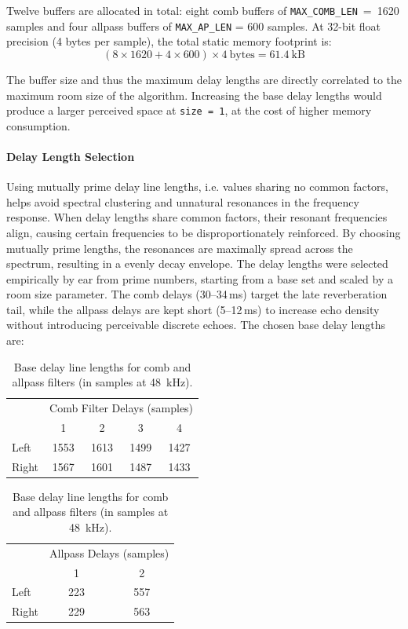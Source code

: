 Twelve buffers are allocated in total: eight comb buffers of \texttt{MAX\_COMB\_LEN}~=~1620 samples and four allpass buffers of \texttt{MAX\_AP\_LEN} = 600 samples. At 32-bit float precision (4 bytes per sample), the total static memory footprint is:
\begin{equation}
(8 \times 1620 + 4 \times 600) \times 4\ \text{bytes} = 61.4\ \text{kB}
\end{equation}

The buffer size and thus the maximum delay lengths are directly correlated to the maximum room size of the algorithm. 
Increasing the base delay lengths would produce a larger perceived space at \texttt{size = 1}, at the cost of higher memory consumption. 

\paragraph{Delay Length Selection} Using mutually prime delay line lengths, i.e. values sharing no common factors, helps avoid spectral clustering and unnatural resonances in the frequency response. 
When delay lengths share common factors, their resonant frequencies align, causing certain frequencies to be disproportionately reinforced. By choosing mutually prime lengths, the resonances are maximally spread across the spectrum, resulting in a evenly decay envelope.
The delay lengths were selected empirically by ear from prime numbers, starting from a base set and scaled by a room size parameter. 
The comb delays (30--34\,ms) target the late reverberation tail, while the allpass delays are kept short (5--12\,ms) to increase echo density without introducing perceivable discrete echoes. 
The chosen base delay lengths are:

\begin{table}[H]
    \centering
    \begin{tabular}{lcccc}
        \hline
        & \multicolumn{4}{c}{Comb Filter Delays (samples)} \\
        & 1 & 2 & 3 & 4 \\
        \hline
        Left  & 1553 & 1613 & 1499 & 1427 \\
        Right & 1567 & 1601 & 1487 & 1433 \\
        \hline
    \end{tabular}
    \hspace{2em}
    \begin{tabular}{lcc}
        \hline
        & \multicolumn{2}{c}{Allpass Delays (samples)} \\
        & 1 & 2 \\
        \hline
        Left  & 223 & 557 \\
        Right & 229 & 563 \\
        \hline
    \end{tabular}
    \caption{Base delay line lengths for comb and allpass filters (in samples at \qty{48}{\kilo\hertz}).}
    \label{tab:delay-lengths}
\end{table}

